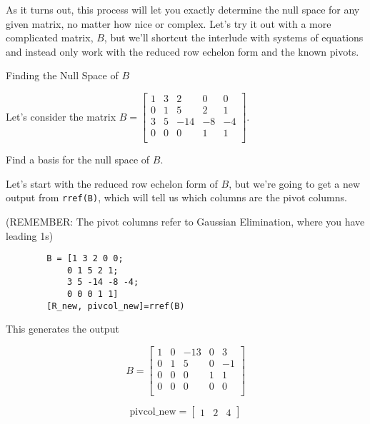 \documentclass{ximera}
\begin{document}
As it turns out, this process will let you exactly determine the null space for any given matrix, no matter how nice or complex. Let's try it out with a more complicated matrix, $B$, but we'll shortcut the interlude with systems of equations and instead only work with the reduced row echelon form and the known pivots.

\begin{problem}{Finding the Null Space of $B$}

    Let's consider the matrix $B=\begin{bmatrix}
        1 & 3 & 2 & 0 & 0  \\
        0 & 1 & 5 & 2 & 1  \\
        3 & 5 & -14 & -8 &-4  \\
        0 & 0 & 0 & 1 & 1  \\
        \end{bmatrix}$.

    Find a basis for the null space of $B$.

    \begin{solution}

        Let's start with the reduced row echelon form of $B$, but we're going to get a new output from \texttt{rref(B)}, which will tell us which columns are the pivot columns.

        (REMEMBER: The pivot columns refer to Gaussian Elimination, where you have leading 1s)

       \begin{verbatim}
        B = [1 3 2 0 0; 
            0 1 5 2 1; 
            3 5 -14 -8 -4; 
            0 0 0 1 1]
        [R_new, pivcol_new]=rref(B)
    \end{verbatim}

        This generates the output
        
        \[
            B=\begin{bmatrix}
                1 & 0 & -13 & 0 & 3 \\
                0 & 1 & 5 & 0 & -1 \\
                0 & 0 & 0 & 1 & 1 \\
                0 & 0 & 0 & 0 & 0 \\
            \end{bmatrix}
        \]


    $$\text{pivcol\_new}=\begin{bmatrix} 1 & 2 & 4 \end{bmatrix}$$


\end{solution}
\end{problem}
\end{document}
